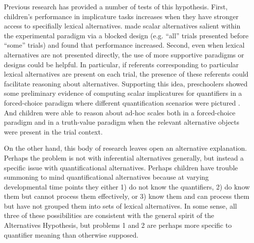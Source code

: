 \documentclass[man]{apa2}
\begin{document}
Previous research has provided a number of tests of this hypothesis. First,  children's performance in implicature tasks increases when they have stronger access to specifially lexical alternatives.  made scalar alternatives salient within the experimental paradigm via a blocked design (e.g. ``all'' trials presented before ``some'' trials) and found that performance increased. Second, even when lexical alternatives are not presented directly, the use of more supportive paradigms or designs could be helpful. In particular, if referents corresponding to particular lexical alternatives are present on each trial, the presence of these referents could facilitate reasoning about alternatives. Supporting this idea, preschoolers showed some preliminary evidence of computing scalar implicatures for quantifiers in a forced-choice paradigm where different quantification scenarios were pictured \cite{miller2005}. And children were able to reason about ad-hoc scales both in a forced-choice paradigm \cite{stiller2014} and in a truth-value paradigm \cite{barner2011} when the relevant alternative objects were present in the trial context.

On the other hand, this body of research leaves open an alternative explanation. Perhaps the problem is not with inferential alternatives generally, but instead a specific issue with quantificational alternatives. Perhaps children have trouble summoning to mind quantificational alternatives because at varying developmental time points they either 1) do not know the quantifiers, 2) do know them but cannot process them effectively, or 3) know them and can process them but have not grouped them into sets of lexical alternatives. In some sense, all three of these possibilities are consistent with the general spirit of the Alternatives Hypothesis, but problems 1 and 2 are perhaps more specific to quantifier meaning than otherwise supposed.
\end{document}
